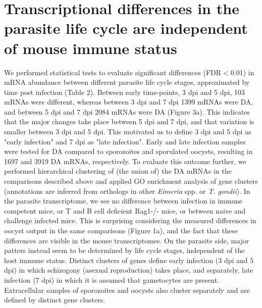 \documentclass{bmcart}
\begin{document}
\section*{Transcriptional differences in the parasite life cycle are independent of mouse immune status}
We performed statistical tests to evaluate significant differences (FDR$<$0.01) in mRNA abundance between different parasite life cycle stages, approximated by time post infection (Table 2). Between early time-points, 3 dpi and 5 dpi, 103 mRNAs were different, whereas between 3 dpi and 7 dpi 1399 mRNAs were DA, and between 5 dpi and 7 dpi 2084 mRNAs were DA (Figure 3a). This indicates that the major changes take place between 5 dpi and 7 dpi, and that variation is smaller between 3 dpi and 5 dpi. This motivated us to define 3 dpi and 5 dpi as "early infection" and 7 dpi as "late infection". Early and late infection samples were tested for DA compared to sporozoites and sporulated oocysts, resulting in 1697 and 3919 DA mRNAs, respectively.
To evaluate this outcome further, we performed hierarchical clustering of (the union of) the DA mRNAs in the comparisons described above and applied GO enrichment analysis of gene clusters (annotations are inferred from orthologs in other \textit{Eimeria} spp. or \textit{T. gondii}). In the parasite transcriptome, we see no difference between infection in immune competent mice, or T and B cell deficient Rag1-/- mice, or between naive and challenge infected mice. This is surprising considering the measured differences in oocyst output in the same comparisons (Figure 1a), and the fact that these differences are visible in the mouse transcriptomes. On the parasite side, major patters instead seem to be determined by life cycle stages, independent of the host immune status. Distinct clusters of genes define early infection (3 dpi and 5 dpi) in which schizogony (asexual reproduction) takes place, and separately, late infection (7 dpi) in which it is assumed that gametocytes are present. Extracellular samples of sporozoites and oocysts also cluster separately and are defined by distinct gene clusters. 
\end{document}
